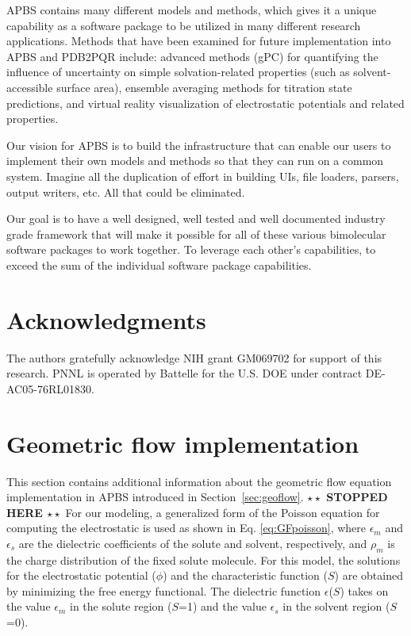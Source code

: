 \documentclass[11pt,titlepage]{article}
\newcommand{\todo}[1]{\textbf{$\star \star$ {#1} $\star \star$}}
\begin{document}
APBS contains many different models and methods, which gives it a unique capability as a software package to be utilized in many different research applications. Methods that have been examined for future implementation into APBS and PDB2PQR include: advanced methods (gPC) for quantifying the influence of uncertainty on simple solvation-related properties (such as solvent-accessible surface area), ensemble averaging methods for titration state predictions, and virtual reality visualization of electrostatic potentials and related properties.

Our vision for APBS is to build the infrastructure that can enable our users to implement their own models and methods so that they can run on a common system. Imagine all the duplication of effort in building UIs, file loaders, parsers, output writers, etc. All that could be eliminated. 

Our goal is to have a well designed, well tested and well documented industry grade framework that will make it possible for all of these various bimolecular software packages to work together. To leverage each other's capabilities, to exceed the sum of the individual software package capabilities.

\section{Acknowledgments}
The authors gratefully acknowledge NIH grant GM069702 for support of this research.
PNNL is operated by Battelle for the U.S. DOE under contract DE-AC05-76RL01830.  



\pagebreak

\appendix

\section{Geometric flow implementation} \label{app:geoflow}
This section contains additional information about the geometric flow equation implementation in APBS introduced in Section~\ref{sec:geoflow}.
\todo{STOPPED HERE}
For our modeling, a generalized form of the Poisson equation for computing the electrostatic is used as shown in Eq. \ref{eq:GFpoisson}, where $\epsilon_m$ and $\epsilon_s$ are the dielectric coefficients of the solute and solvent, respectively, and $\rho_m$ is the charge distribution of the fixed solute molecule. For this model, the solutions for the electrostatic potential ($\phi$) and the characteristic function ($S$) are obtained by minimizing the free energy functional. The dielectric function $\epsilon$($S$) takes on the value $\epsilon_m$ in the solute region ($S$=1) and the value $\epsilon_s$ in the solvent region ($S$=0).
\end{document}

